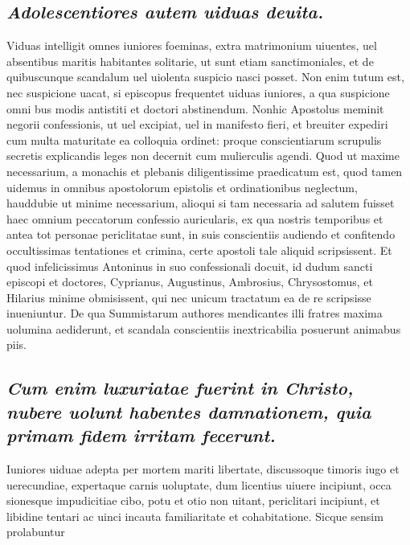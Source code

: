 \documentclass{article}
\begin{document}
\begin{pages}
\subsection*{\textit{Adolescentiores autem uiduas deuita. }}\pstart Viduas intelligit omnes iuniores foeminas, extra matrimonium uiuentes, uel absentibus maritis habitantes solitarie, ut sunt etiam sanctimoniales, et de quibuscunque scandalum uel uiolenta suspicio nasci posset. Non enim tutum est, nec suspicione uacat, si episcopus frequentet uiduas iuniores, a qua suspicione omni bus modis antistiti et doctori abstinendum. Nonhic Apostolus meminit negorii confessionis, ut uel excipiat, uel in manifesto fieri, et breuiter expediri cum multa maturitate ea colloquia ordinet: proque conscientiarum scrupulis secretis explicandis leges non decernit cum mulierculis agendi. Quod ut maxime necessarium, a monachis et plebanis diligentissime praedicatum est, quod tamen uidemus in omnibus apostolorum epistolis et ordinationibus neglectum, hauddubie ut minime necessarium, alioqui si tam necessaria ad salutem fuisset haec omnium peccatorum confessio auricularis, ex qua nostris temporibus et antea tot personae periclitatae sunt, in suis conscientiis audiendo et confitendo occultissimas tentationes et crimina, certe apostoli tale aliquid scripsissent. Et quod infelicissimus Antoninus in suo confessionali docuit, id dudum sancti episcopi et doctores, Cyprianus, Augustinus, Ambrosius, Chrysostomus, et Hilarius minime obmisissent, qui nec unicum tractatum ea de re scripsisse inueniuntur. De qua Summistarum authores mendicantes illi fratres maxima uolumina aediderunt, et scandala conscientiis inextricabilia posuerunt animabus piis.  \pend
{}
{}
\subsection*{\textit{Cum enim luxuriatae fuerint in Christo, nubere uolunt habentes damnationem, quia primam fidem irritam fecerunt. }}\pstart Iuniores uiduae adepta per mortem mariti libertate, discussoque timoris iugo et uerecundiae, expertaque carnis uoluptate, dum licentius uiuere incipiunt, occa sionesque impudicitiae cibo, potu et otio non uitant, periclitari incipiunt, et libidine tentari ac uinci incauta familiaritate et cohabitatione. Sicque sensim prolabuntur  \pend

\end{pages}
\end{document}
